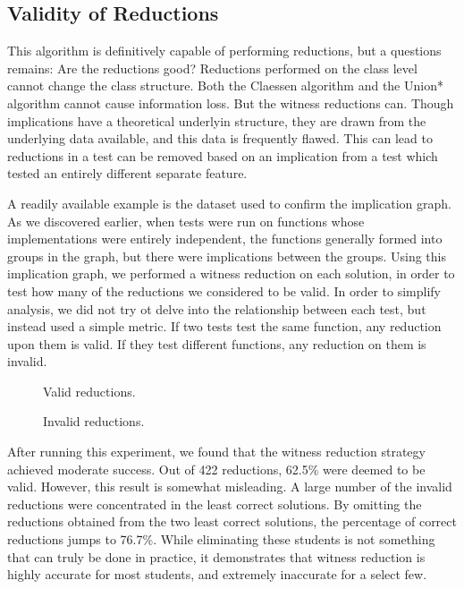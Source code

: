 \documentclass[11pt]{article}
\begin{document}
\subsection{Validity of Reductions}

This algorithm is definitively  capable of performing reductions, but a questions remains: Are the reductions good? Reductions performed on the class level cannot change the class structure. Both the Claessen algorithm and the Union* algorithm cannot cause information loss. But the witness reductions can. Though implications have a theoretical underlyin structure, they are drawn from the underlying data available, and this data is frequently flawed. This can lead to reductions in a test can be removed based on an implication from a test which tested an entirely different separate feature.

A readily available example is the dataset used to confirm the implication graph. As we discovered earlier, when tests were run on functions whose implementations were entirely independent, the functions generally formed into groups in the  graph, but there were implications between the groups. Using this implication graph, we performed a witness reduction on each solution, in order to test how many of the reductions we considered to be valid. In order to simplify analysis, we did not try ot delve into the relationship between each test, but instead used a simple metric. If two tests test the same function, any reduction upon them is valid. If they test different  functions, any reduction on them is invalid.


\begin{figure}

\caption{Valid reductions.}

\caption{Invalid reductions.}
\end{figure}


After running this experiment, we found that the witness reduction strategy achieved moderate success. Out of 422 reductions, 62.5\% were deemed to be valid. However, this result is somewhat misleading. A large number of the invalid reductions were concentrated in the least correct solutions. By omitting the reductions obtained from the two least correct solutions, the percentage of correct reductions jumps to 76.7\%. While eliminating these students is not something that can truly be done in practice, it demonstrates that witness reduction is highly accurate for most students, and extremely inaccurate for a select few.
\end{document}
